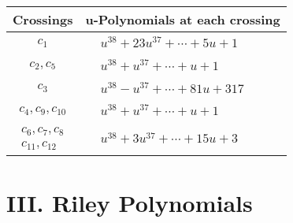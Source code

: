 \documentclass[1p]{elsarticle_modified}
\theoremstyle{definition}
\begin{document}
\begin{tabular}{m{50pt}|m{274pt}}
Crossings & \hspace{64pt}u-Polynomials at each crossing \\
\hline $$\begin{aligned}c_{1}\end{aligned}$$&$\begin{aligned}
&u^{38}+23 u^{37}+\cdots+5 u+1
\end{aligned}$\\
\hline $$\begin{aligned}c_{2},c_{5}\end{aligned}$$&$\begin{aligned}
&u^{38}+u^{37}+\cdots+u+1
\end{aligned}$\\
\hline $$\begin{aligned}c_{3}\end{aligned}$$&$\begin{aligned}
&u^{38}- u^{37}+\cdots+81 u+317
\end{aligned}$\\
\hline $$\begin{aligned}c_{4},c_{9},c_{10}\end{aligned}$$&$\begin{aligned}
&u^{38}+u^{37}+\cdots+u+1
\end{aligned}$\\
\hline $$\begin{aligned}c_{6},c_{7},c_{8}\\c_{11},c_{12}\end{aligned}$$&$\begin{aligned}
&u^{38}+3 u^{37}+\cdots+15 u+3
\end{aligned}$\\
\hline
\end{tabular}\newpage\renewcommand{\arraystretch}{1}
\centering \section*{ III. Riley Polynomials}
\end{document}
